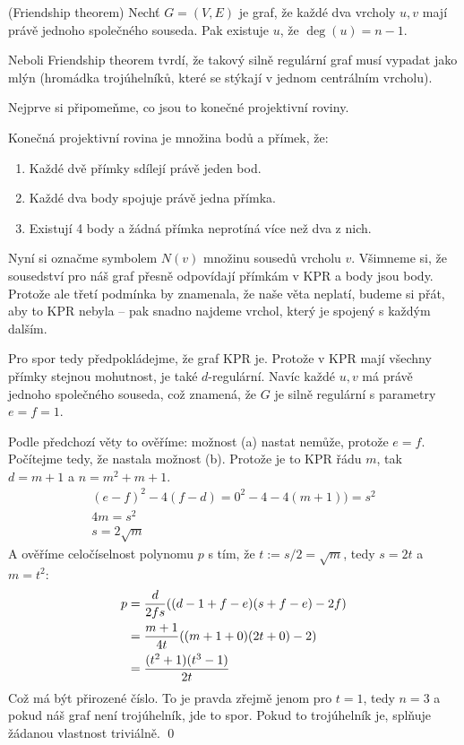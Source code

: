 \vt (Friendship theorem) Nechť $G=(V,E)$ je graf, že každé dva vrcholy $u,v$ mají právě jednoho společného souseda. Pak existuje $u$, že $\deg(u) = n-1$.

Neboli Friendship theorem tvrdí, že takový silně regulární graf musí vypadat jako
mlýn (hromádka trojúhelníků, které se stýkají v jednom centrálním vrcholu). 

\dk Nejprve si připomeňme, co jsou to konečné projektivní roviny.

\df Konečná projektivní rovina je množina bodů a přímek, že:
\begin{enumerate}
	\item Každé dvě přímky sdílejí právě jeden bod.
	\item Každé dva body spojuje právě jedna přímka.
	\item Existují 4 body a žádná přímka neprotíná více než dva z nich.
\end{enumerate}

Nyní si označme symbolem $N(v)$ množinu sousedů vrcholu $v$. Všimneme si, že
sousedství pro náš graf přesně odpovídají přímkám v KPR a body jsou body. Protože ale třetí
podmínka by znamenala, že naše věta neplatí, budeme si přát, aby to KPR nebyla
-- pak snadno najdeme vrchol, který je spojený s každým dalším.

Pro spor tedy předpokládejme, že graf KPR je. Protože v KPR mají všechny přímky stejnou mohutnost, je také $d$-regulární. Navíc každé $u,v$ má právě jednoho společného souseda, což znamená, že $G$ je silně regulární s parametry  $e=f=1$.

Podle předchozí věty to ověříme: možnost (a) nastat nemůže, protože $e=f$.
Počítejme tedy, že nastala možnost (b). Protože je to KPR řádu $m$, tak $d=m+1$ a $n=m^2 + m + 1$.
\begin{align}
	(e-f)^2 - 4(f-d) = 0^2 - 4 - 4(m+1))= s^2 \\
	4m = s^2 \\
	s=2\sqrt m 
\end{align}
A ověříme celočíselnost polynomu $p$ s tím, že $t:=s/2=\sqrt m$, tedy $s=2t$ a $m=t^2$:
\begin{align}
	p &= {d \over 2fs} ((d-1+f-e)(s+f-e)-2f) \\
	&= {m+1 \over 4t} ((m+1+0)(2t+0)-2)\\
	&= {(t^2 + 1)(t^3-1) \over 2t}
\end{align}
Což má být přirozené číslo. To je pravda zřejmě jenom pro $t=1$, tedy $n=3$ a pokud náš graf není trojúhelník, jde to spor. Pokud to trojúhelník je, splňuje žádanou vlastnost triviálně. \qed


